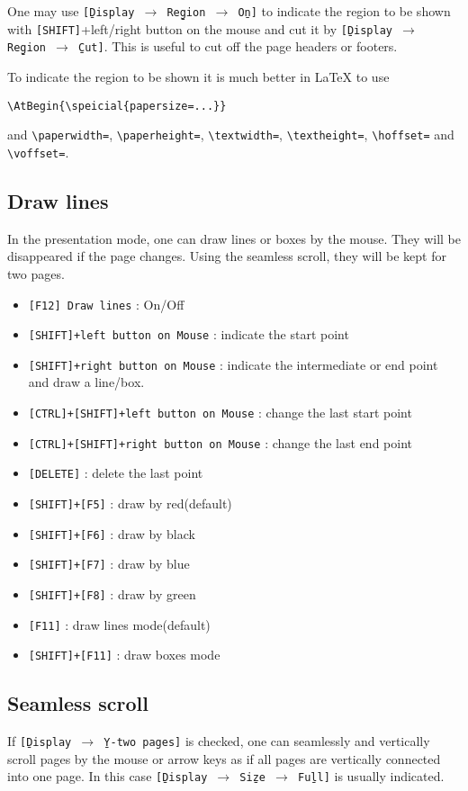 \documentclass{article}
\begin{document}
One may use {\tt[\b{D}isplay $\to$ Re\b{g}ion $\to$ O\b{n}]} to indicate
the region to be shown with {\tt [SHIFT]}+left/right button on the mouse 
and cut it by {\tt[\b{D}isplay $\to$ Re\b{g}ion $\to$ \b{C}ut]}.
This is useful to cut off the page headers or footers.

To indicate the region to be shown it is much better in {\LaTeX} to use 
\begin{verbatim}
\AtBegin{\speicial{papersize=...}}
\end{verbatim}
and \verb|\paperwidth=|, 
\verb|\paperheight=|, \verb|\textwidth=|, \verb|\textheight=|, 
\verb|\hoffset=| and \verb|\voffset=|.
\subsection{Draw lines}
In the presentation mode, one can draw lines or boxes by the mouse.
They will be disappeared if the page changes.
Using the seamless scroll, they will be kept for two pages.
\begin{itemize}
\item
{\tt [F12] Draw lines} : On/Off
\item
{\tt [SHIFT]+left button on Mouse} : indicate the start point
\item
{\tt [SHIFT]+right button on Mouse} : indicate the intermediate or end point and draw
a line/box.
\item
{\tt [CTRL]+[SHIFT]+left button on Mouse} : change the last start point
\item
{\tt [CTRL]+[SHIFT]+right button on Mouse} : change the last end point
\item
{\tt [DELETE]} : delete the last point
\item
{\tt [SHIFT]+[F5]} : draw by red(default)
\item
{\tt [SHIFT]+[F6]} : draw by black
\item
{\tt [SHIFT]+[F7]} : draw by blue
\item
{\tt [SHIFT]+[F8]} : draw by green
\item
{\tt [F11]} : draw lines mode(default)
\item
{\tt [SHIFT]+[F11]} : draw boxes mode
\end{itemize}
\subsection{Seamless scroll}
If {\tt[\b{D}isplay $\to$ \b{Y}-two pages]} is checked, one can seamlessly
and vertically scroll pages by the mouse or arrow keys as if all pages are vertically 
connected into one page.
In this case {\tt[\b{D}isplay $\to$ Si\b{z}e $\to$ Fu\b{l}l]} is usually 
indicated.
\end{document}
